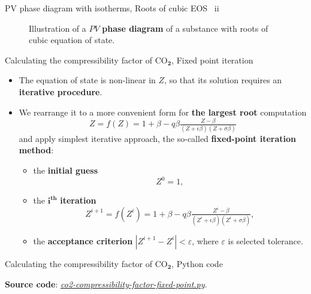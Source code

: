 \begin{frame}{PV phase diagram with isotherms, Roots of cubic EOS \, ii}
\begin{figure}
\caption{\footnotesize Illustration of a $PV$ \textbf{phase diagram} of a substance with roots of cubic equation of state.}
\end{figure}
\ecol
\end{frame}
%
\begin{frame}{Calculating the compressibility factor of CO$_{\boldsymbol{2}}$, Fixed point iteration}
\begin{itemize}
\item The equation of state is non-linear in $Z$, so that its solution requires an \textbf{iterative procedure}.
%
\pause
\item We rearrange it to a more convenient form for \textbf{the largest root} computation \citep{Smith2005}
\[
\boxed{Z = f(Z) = 1+\beta-q\beta\tfrac{Z-\beta}{(Z+\epsilon\beta)(Z+\sigma\beta)}}
\]
and apply simplest iterative approach, the so-called \alert{\textbf{fixed-point iteration method}}: 
\begin{itemize}
\item the \textbf{initial guess} 
\[
Z^{0}=1,
\]
\item the $\boldsymbol{i^{\text{th}}}$ \textbf{iteration}
\[
Z^{i+1} =f(Z^{i})= 1+\beta-q\beta\tfrac{Z^{i}-\beta}{(Z^{i}+\epsilon\beta)(Z^{i}+\sigma\beta)}, 
\]
%
\item the \textbf{acceptance criterion} $|Z^{i+1}-Z^{i}|<\varepsilon$, where $\varepsilon$ is selected tolerance.
\end{itemize}
\end{itemize}
\end{frame}
%
%
\begin{frame}{Calculating the compressibility factor of CO$_{\boldsymbol{2}}$, Python code}



\textbf{Source code}: \href{https://polybox.ethz.ch/index.php/s/39Sznpv0Eirt45B}{\textcolor{indigo(dye)}{\it co2-compressibility-factor-fixed-point.py}}.

\end{frame}
%
